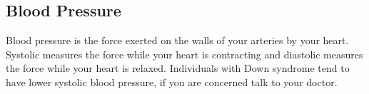 \subsection{Blood Pressure}

Blood pressure is the force exerted on the walls of your arteries by your heart. Systolic measures the force while your heart is contracting and diastolic measures the force while your heart is relaxed. Individuals with Down syndrome tend to have lower systolic blood pressure, if you are concerned talk to your doctor.
